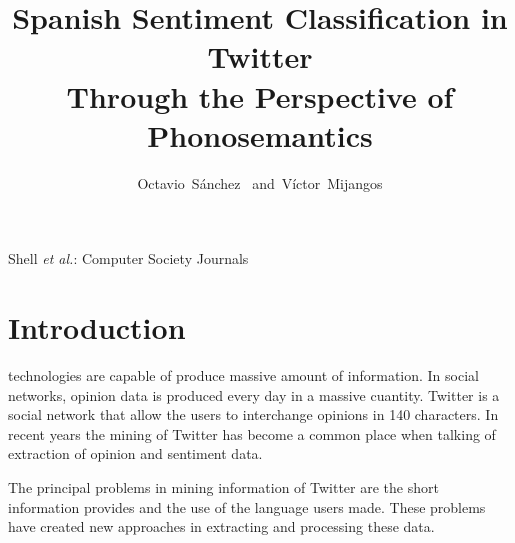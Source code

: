 \documentclass[12pt,journal,compsoc]{IEEEtran}
\begin{document}
\title{Spanish Sentiment Classification in Twitter\\Through the Perspective of Phonosemantics}


\author{Octavio~S\'anchez~%
        and~V\'ictor~Mijangos
  			
% 
}


%
{Shell \MakeLowercase{\textit{et al.}}: Computer Society Journals}




\maketitle
\IEEEdisplaynotcompsoctitleabstractindextext
\IEEEpeerreviewmaketitle

\section{Introduction}

 technologies are capable of produce massive amount of information. In social networks, opinion data is produced every day in a massive cuantity. Twitter is a social network that allow the users to interchange opinions in 140 characters. In recent years the mining of Twitter has become a common place when talking of extraction of opinion and sentiment data.
 
The principal problems in mining information of Twitter are the short information provides and the use of the language users made. These problems have created new approaches in extracting and processing these data. 
\end{document}
